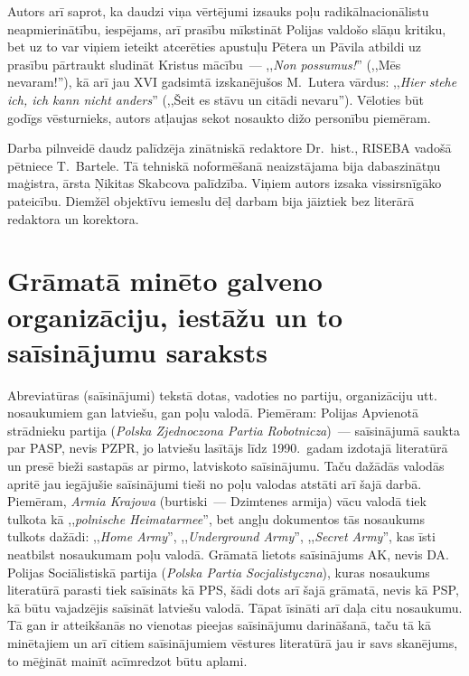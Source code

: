 \documentclass[twoside,a5paper,12pt,fleqn,openany]{extbook}
\newcommand{\pltxti}[1]{\textit{\textpolish{#1}}}
\newcommand{\detxti}[1]{\textit{\textgerman{#1}}}
\newcommand{\entxti}[1]{\textit{\textenglish{#1}}}
\newcommand{\latxti}[1]{\textit{\textlatin{#1}}}
\begin{document}
Autors arī saprot, ka daudzi viņa vērtējumi izsauks poļu radikālnacionālistu neapmierinātību, iespējams, arī prasību mīkstināt Polijas valdošo slāņu kritiku, bet uz to var viņiem ieteikt atcerēties apustuļu Pētera un Pāvila atbildi uz prasību pārtraukt sludināt Kristus mācību~--- ,,\latxti{Non possumus!}” (,,Mēs nevaram!”), kā arī jau XVI gadsimtā izskanējušos M.~Lutera vārdus: ,,\detxti{Hier stehe ich, ich kann nicht anders}” (,,Šeit es stāvu un citādi nevaru”).
Vēloties būt godīgs vēsturnieks, autors atļaujas sekot nosaukto dižo personību piemēram.

Darba pilnveidē daudz palīdzēja zinātniskā redaktore Dr.~hist., RISEBA vadošā pētniece T.~Bartele.
Tā tehniskā noformēšanā neaizstājama bija dabaszinātņu maģistra, ārsta Ņikitas Skabcova palīdzība.
Viņiem autors izsaka vissirsnīgāko pateicību.
Diemžēl objektīvu iemeslu dēļ darbam bija jāiztiek bez literārā redaktora un korektora.

\chapter*{Grāmatā minēto galveno organizāciju, iestāžu un to saīsinājumu saraksts}

Abreviatūras (saīsinājumi) tekstā dotas, vadoties no partiju, organizāciju utt. nosaukumiem gan latviešu, gan poļu valodā.
Piemēram: Polijas Apvienotā strādnieku partija (\pltxti{Polska Zjednoczona Partia Robotnicza})~--- saīsinājumā saukta par PASP, nevis PZPR, jo latviešu lasītājs līdz 1990.~gadam izdotajā literatūrā un presē bieži sastapās ar pirmo, latviskoto saīsinājumu.
Taču dažādās valodās apritē jau iegājušie saīsinājumi tieši no poļu valodas atstāti arī šajā darbā.
Piemēram, \pltxti{Armia Krajowa} (burtiski~--- Dzimtenes armija) vācu valodā tiek tulkota kā ,,\detxti{polnische Heimatarmee}'', bet angļu dokumentos tās nosaukums tulkots dažādi: ,,\entxti{Home Army}'', ,,\entxti{Underground Army}'', ,,\entxti{Secret Army}'', kas īsti neatbilst nosaukumam poļu valodā.
Grāmatā lietots saīsinājums AK, nevis DA.
Polijas Sociālistiskā partija (\pltxti{Polska Partia Socjalistyczna}), kuras nosaukums literatūrā parasti tiek saīsināts kā PPS, šādi dots arī šajā grāmatā, nevis kā PSP, kā būtu vajadzējis saīsināt latviešu valodā.
Tāpat īsināti arī daļa citu nosaukumu.
Tā gan ir atteikšanās no vienotas pieejas saīsinājumu darināšanā, taču tā kā minētajiem un arī citiem saīsinājumiem vēstures literatūrā jau ir savs skanējums, to mēģināt mainīt acīmredzot būtu aplami.
\end{document}
